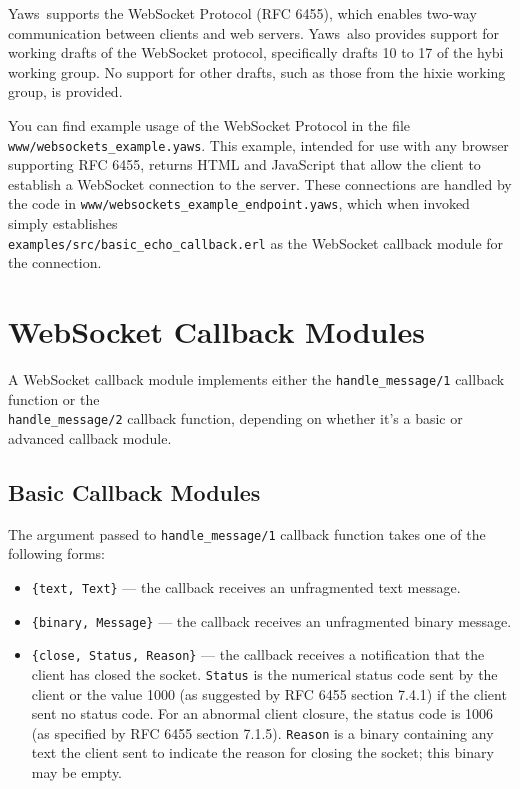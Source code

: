 \documentclass[11pt,oneside,english]{book}
\newcommand{\Yaws}            %
        {{\sc Yaws}}
\begin{document}
\Yaws\ supports the WebSocket Protocol (RFC 6455), which enables
two-way communication between clients and web servers. \Yaws\ also
provides support for working drafts of the WebSocket protocol,
specifically drafts 10 to 17 of the hybi working group. No support for
other drafts, such as those from the hixie working group, is provided.

You can find example usage of the WebSocket Protocol in the file
\verb+www/websockets_example.yaws+. This example, intended for use
with any browser supporting RFC 6455, returns HTML and JavaScript that
allow the client to establish a WebSocket connection to the
server. These connections are handled by the code in
\verb+www/websockets_example_endpoint.yaws+, which when invoked simply
establishes \\ \verb+examples/src/basic_echo_callback.erl+ as the
WebSocket callback module for the connection.

\section{WebSocket Callback Modules}

A WebSocket callback module implements either the
\verb+handle_message/1+ callback function or the
\\ \verb+handle_message/2+ callback function, depending on whether
it's a basic or advanced callback module.

\subsection{Basic Callback Modules}

The argument passed to \verb+handle_message/1+ callback function takes
one of the following forms:

\begin{itemize}

\item \verb+{text, Text}+ --- the callback receives an unfragmented
  text message.

\item \verb+{binary, Message}+ --- the callback receives an
  unfragmented binary message.

\item \verb+{close, Status, Reason}+ --- the callback receives a
  notification that the client has closed the socket. \verb+Status+ is the
  numerical status code sent by the client or the value 1000 (as suggested
  by RFC 6455 section 7.4.1) if the client sent no status code. For an
  abnormal client closure, the status code is 1006 (as specified by RFC
  6455 section 7.1.5). \verb+Reason+ is a binary containing any text the
  client sent to indicate the reason for closing the socket; this binary
  may be empty.

\end{itemize}
\end{document}

